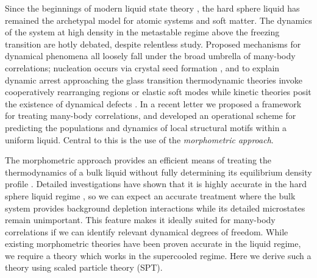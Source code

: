 \documentclass[11pt,twoside]{report}
\begin{document}
Since the beginnings of modern liquid state theory \cite{KirkwoodJCP1935}, the hard sphere liquid has remained the archetypal model for atomic systems and soft matter.
The dynamics of the system at high density in the metastable regime above the freezing transition are hotly debated, despite relentless study.
Proposed mechanisms for dynamical phenomena all loosely fall under the broad umbrella of many-body correlations; nucleation occurs via crystal seed formation \cite{SearJPCM2007}, and to explain dynamic arrest approaching the glass transition thermodynamic theories invoke cooperatively rearranging regions \cite{LubchenkoARPC2007} or elastic soft modes \cite{BritoJCP2009} while kinetic theories posit the existence of dynamical defects \cite{ChandlerARPC2010}.
In a recent letter \cite{RobinsonPRL2019} we proposed a framework for treating many-body correlations, and developed an operational scheme for predicting the populations and dynamics of local structural motifs within a uniform liquid.
Central to this is the use of the \emph{morphometric approach}.

The morphometric approach provides an efficient means of treating the thermodynamics of a bulk liquid without fully determining its equilibrium density profile \cite{KonigPRL2004,RothPRL2006,Hansen-GoosPRL2007,RobinsonPRL2019}.
Detailed investigations have shown that it is highly accurate in the hard sphere liquid regime \cite{OettelEL2009,AshtonPRE2011,LairdPRE2012,BlokhuisPRE2013,UrrutiaPRE2014,Hansen-GoosJCP2014}, so we can expect an accurate treatment where the bulk system provides background depletion interactions while its detailed microstates remain unimportant.
This feature makes it ideally suited for many-body correlations if we can identify relevant dynamical degrees of freedom.
While existing morphometric theories have been proven accurate in the liquid regime, we require a theory which works in the supercooled regime.
Here we derive such a theory using scaled particle theory (SPT).
\end{document}
